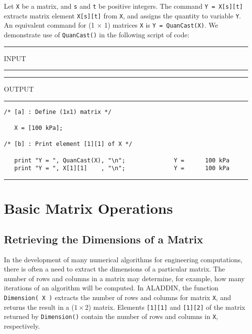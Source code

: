 \vspace{0.15 in}
\noindent\hspace{0.5 in}
Let {\tt X} be a matrix, and {\tt s} and {\tt t} be positive integers.
The command {\tt Y = X[s][t]} extracts matrix element {\tt X[s][t]} from {\tt X},
and assigns the quantity to variable {\tt Y}.  An equivalent command
for (1 $\times$ 1) matrices {\tt X} is {\tt Y = QuanCast(X)}.
We demonstrate use of {\tt QuanCast()} in the following script of code:

\vspace{0.15 in}
\begin{footnotesize}
\noindent
\rule{1.2 in}{0.035 in} INPUT \rule{1.2 in}{0.035 in}\hspace{0.1 in}
\rule{1.3 in}{0.035 in} OUTPUT\rule{1.3 in}{0.035 in}
\begin{verbatim}
/* [a] : Define (1x1) matrix */

   X = [100 kPa];

/* [b] : Print element [1][1] of X */

   print "Y = ", QuanCast(X), "\n";              Y =      100 kPa
   print "Y = ", X[1][1]    , "\n";              Y =      100 kPa
\end{verbatim}
\rule{6.25 in}{0.035 in}
\end{footnotesize}

\vspace{0.15 in}
\section{Basic Matrix Operations}

\subsection{Retrieving the Dimensions of a Matrix}

\vspace{0.15 in}
\noindent\hspace{0.5 in}
In the development of many numerical algorithms for engineering computations,
there is often a need to extract the dimensions of a particular matrix.
The number of rows and columns in a matrix may determine, for example,
how many iterations of an algorithm will be computed.
In ALADDIN, the function {\tt Dimension( X )} extracts the 
number of rows and columns for matrix {\tt X}, and returns
the result in a ($1 \times 2$) matrix.
Elements {\tt [1][1]} and {\tt [1][2]} of the matrix returned by
{\tt Dimension()} contain the number of
rows and columns in {\tt X}, respectively.


